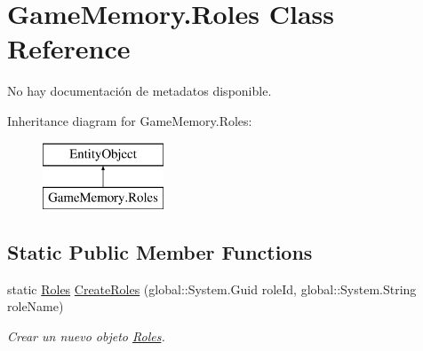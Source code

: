 \hypertarget{class_game_memory_1_1_roles}{\section{Game\-Memory.\-Roles Class Reference}
\label{class_game_memory_1_1_roles}
}


No hay documentación de metadatos disponible.  


Inheritance diagram for Game\-Memory.\-Roles\-:\begin{figure}[H]
\begin{center}
\leavevmode
\includegraphics[height=2.000000cm]{class_game_memory_1_1_roles}
\end{center}
\end{figure}
\subsection*{Static Public Member Functions}
\begin{DoxyCompactItemize}
\item 
static \hyperlink{class_game_memory_1_1_roles}{Roles} \hyperlink{class_game_memory_1_1_roles_ae2ea4c860f98d4348a4d715b150ecbe5}{Create\-Roles} (global\-::\-System.\-Guid role\-Id, global\-::\-System.\-String role\-Name)
\begin{DoxyCompactList}\small\item\em Crear un nuevo objeto \hyperlink{class_game_memory_1_1_roles}{Roles}. \end{DoxyCompactList}\end{DoxyCompactItemize}
